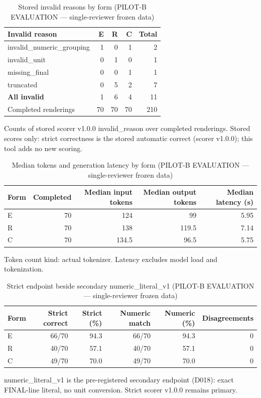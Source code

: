 \begin{table}[t]
\centering
\small
\caption{Stored invalid reasons by form (PILOT-B EVALUATION --- single-reviewer frozen data)}
\label{tab:pilotb-Llama-3.2-3B-Instruct-invalid}
\begin{tabular}{lrrrr}
\toprule
Invalid reason & E & R & C & Total \\
\midrule
invalid\_numeric\_grouping & 1 & 0 & 1 & 2 \\
invalid\_unit & 0 & 1 & 0 & 1 \\
missing\_final & 0 & 0 & 1 & 1 \\
truncated & 0 & 5 & 2 & 7 \\
\textbf{All invalid} & 1 & 6 & 4 & 11 \\
Completed renderings & 70 & 70 & 70 & 210 \\
\bottomrule
\end{tabular}
\par\smallskip
\parbox{\linewidth}{\footnotesize Counts of stored scorer v1.0.0 invalid\_reason over completed renderings. Stored scores only: strict correctness is the stored automatic correct (scorer v1.0.0); this tool adds no new scoring.}
\end{table}

\begin{table}[t]
\centering
\small
\caption{Median tokens and generation latency by form (PILOT-B EVALUATION --- single-reviewer frozen data)}
\label{tab:pilotb-Llama-3.2-3B-Instruct-resources}
\begin{tabular}{lrrrr}
\toprule
Form & Completed & Median input tokens & Median output tokens & Median latency (s) \\
\midrule
E & 70 & 124 & 99 & 5.95 \\
R & 70 & 138 & 119.5 & 7.14 \\
C & 70 & 134.5 & 96.5 & 5.75 \\
\bottomrule
\end{tabular}
\par\smallskip
\parbox{\linewidth}{\footnotesize Token count kind: actual tokenizer. Latency excludes model load and tokenization.}
\end{table}

\begin{table}[t]
\centering
\small
\caption{Strict endpoint beside secondary numeric\_literal\_v1 (PILOT-B EVALUATION --- single-reviewer frozen data)}
\label{tab:pilotb-Llama-3.2-3B-Instruct-numeric}
\begin{tabular}{lrrrrr}
\toprule
Form & Strict correct & Strict (\%) & Numeric match & Numeric (\%) & Disagreements \\
\midrule
E & 66/70 & 94.3 & 66/70 & 94.3 & 0 \\
R & 40/70 & 57.1 & 40/70 & 57.1 & 0 \\
C & 49/70 & 70.0 & 49/70 & 70.0 & 0 \\
\bottomrule
\end{tabular}
\par\smallskip
\parbox{\linewidth}{\footnotesize numeric\_literal\_v1 is the pre-registered secondary endpoint (D018): exact FINAL-line literal, no unit conversion. Strict scorer v1.0.0 remains primary.}
\end{table}
